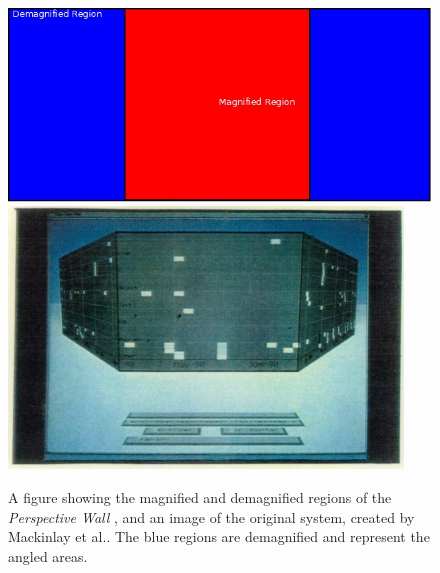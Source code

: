 \begin{figure}[htp] \centering
    \includegraphics[width=0.45\linewidth]{img/Perspective_Wall.jpg}
    \includegraphics[width=0.45\linewidth]{img/perspective_wall_actual.jpg}
    \caption[Perspective Wall Diagram]{A figure showing the magnified and demagnified regions of the 
        \emph{Perspective Wall} \cite{Mackinlay1991}, and an image of the original system, created by Mackinlay 
        et al.. The blue regions are demagnified and represent the angled areas.}
    \label{fig:perspective_wall}
\end{figure}

